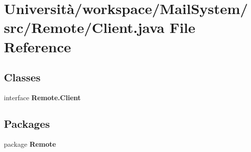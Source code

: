 \section{Università/workspace/\+Mail\+System/src/\+Remote/\+Client.java File Reference}
\label{_client_8java}
\subsection*{Classes}
\begin{DoxyCompactItemize}
\item 
interface \textbf{ Remote.\+Client}
\end{DoxyCompactItemize}
\subsection*{Packages}
\begin{DoxyCompactItemize}
\item 
package \textbf{ Remote}
\end{DoxyCompactItemize}
